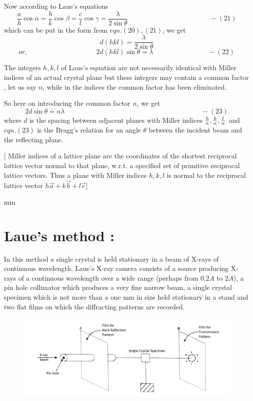 \documentclass[12pt]{article}
\begin{document}
Now according to Laue's equations
$$\frac{a}{h}\cos\alpha=\frac{b}{k}\cos\beta=\frac{c}{l}\cos\gamma=\frac{\lambda}{2\sin\theta} \qquad\qquad\qquad\qquad\qquad\qquad -(21)$$
which can be put in the form from $eqn.(20),(21)$, we get
$$ d(hkl)=\frac{\lambda}{2\sin\theta}$$
$$or, \qquad\qquad\qquad\qquad\qquad 2d(hkl) \sin\theta=\lambda \qquad\qquad\qquad\qquad-(22)$$

The integers $h,k,l$ of Laue's equation are not necessarily identical with Miller indices of an actual crystal plane but these integers may contain a common factor , let us say $n$, while in the indices the common factor has been eliminated.

So here on introducing the common factor $n$, we get $$ 2d \sin \theta = n\lambda  \qquad\qquad\qquad\qquad\qquad\qquad\qquad\qquad\qquad\qquad -(23)$$ where ${d}$ is the spacing between adjacent planes with Miller indices $\large{\frac{h}{n},\frac{k}{n},\frac{l}{n}}$ 
and $eqn.(23)$ is the Bragg's relation for an angle $\theta$ between the incident beam and the reflecting plane.
 
[ Miller indices of a lattice plane are the coordinates of the shortest reciprocal lattice vector normal to that plane, w.r.t. a specified set of primitive reciprocal lattice vectors. Thus a plane with Miller indices $h,k,l$ is normal to the reciprocal lattice vector $h\vec{a}+k\vec{b}+l\vec{c} $]

 mm
\section {Laue's method :}
In this method a single crystal is held stationary in a beam of X-rays of continuous wavelength. Laue's X-ray camera consists of a source producing X-rays of a continuous wavelength over a wide range (perhaps from 0.2$\mathring{A}$ to 2$\mathring{A}$), a pin hole collimator which produces a very fine narrow beam, a single crystal specimen which is not more than a one mm in size held stationary in a stand and two flat films on which the diffracting patterns are recorded.

\begin{figure}[h!]
  \centering \includegraphics[width= 16cm] {lau.jpg}
\end{figure}
\end{document}
